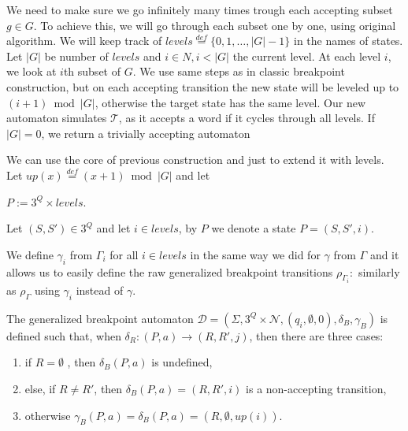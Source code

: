 \documentclass[
	digital
nolof, nolot
]{fithesis3}
\newcommand{\cD}{\mathcal{D}}
\newcommand{\cN}{\mathcal{N}}
\newcommand{\cT}{\mathcal{T}}
\newcommand{\eqdef}{\overset{def}{=}}
\begin{document}
			We need to make sure we go infinitely many times trough each accepting subset $g \in G$.
			To achieve this, we will go through each subset one by one, using original algorithm. We will keep track of $levels\eqdef\{0,1,\ldots,|G|-1\}$ in the names of states. Let $|G|$ be number of $levels$ and $i \in N, i<|G|$ the current level. At each level $i$, we look at $i$th subset of $G$. We use same steps as in classic breakpoint construction, but on each accepting transition the new state will be leveled up to $(i+1)\bmod|G|$, otherwise the target state has the same level. Our new automaton simulates $\cT$, as it accepts a word if it cycles through all levels. If $|G|=0$, we return a trivially accepting automaton
			
			We can use the core of previous construction and just to extend it with levels. Let
			$up(x)\eqdef(x+1)\bmod|G|$ and let 
			
			
			$P := 3^Q \times levels$.
			
			Let $(S,S')\in 3^Q$ and let $i \in levels$, by $P$ we denote a state $P=(S,S',i)$.
			
			We define $\gamma_i$ from $\Gamma_i$ for all $i \in levels$ in the same way we did for $\gamma$ from $\Gamma$ and it allows us to easily define the raw generalized breakpoint transitions
			$\rho_{\Gamma_{i}}\colon$ similarly as $\rho_\Gamma$ using $\gamma_i$ instead of $\gamma$.
			
			
			
			The generalized breakpoint automaton $\cD=(\Sigma, 3^Q\times\cN, ({q_i},\emptyset, 0),\delta_B,\gamma_B)$ is defined such that, when $\delta_R\colon(P, a) \rightarrow (R, R', j)$, then there are three cases:
			
			
			
			\begin{enumerate}
				\item if $R=\emptyset$ , then $\delta_B(P,a)$ is undefined,
				\item else, if $R \neq R'$, then $\delta_B(P,a) = (R,R',i)$ is a non-accepting transition,
				\item otherwise $\gamma_B(P, a) = \delta_B(P,a) = (R, \emptyset, up(i))$.
			\end{enumerate}
		
\end{document}
